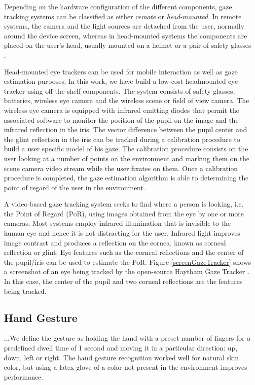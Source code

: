 \documentclass[jou,a4paper,notxfonts]{apa}
\begin{document}
Depending on the hardware configuration of the different components, gaze tracking systems can be classified as either
\textit{remote} or \textit{head-mounted}. In remote systems, the camera and the light sources are detached from the
user, normally around the device screen, whereas in head-mounted systems the components are placed on the user's head, usually
mounted on a helmet or a pair of safety glasses \cite{lowcostitugazetracker}.

Head-mounted eye trackers can be used for mobile interaction as well as gaze estimation purposes.
In this work, we have build a low-cost headmounted eye tracker using off-the-shelf components.  The system consists of
safety glasses, batteries, wireless eye camera and the wireless scene or field of view camera. The wireless eye camera
is equipped with infrared emitting diodes that permit the associated software to monitor the position of the pupil on the
image and the infrared reflection in the iris. The vector difference between the pupil center and the glint reflection
in the iris can be tracked during a calibration procedure to build a user specific model of his gaze. The calibration
procedure consists on the user looking at a number of points on the environment and marking them on the scene camera
video stream while the user fixates on them.  Once a calibration procedure is completed, the gaze estimation algorithm
is able to determining the point of regard of the user in the environment.

A video-based gaze tracking system seeks to find where a person is looking, i.e. the Point of Regard (PoR), using images
obtained from the eye by one or more cameras. Most systems employ infrared illumination that is invisible to the human
eye and hence it is not distracting for the user. Infrared light improves image contrast and produces a reflection on
the cornea, known as corneal reflection or glint. Eye features such as the corneal reflections and the center of the
pupil/iris can be used to estimate the PoR. Figure \ref{screenGazeTracker} shows a screenshot of an eye being tracked by
the open-source Haytham Gaze Tracker \cite{mardanbegi2012eye}. In this case, the center of the pupil and two
corneal reflections are the features being tracked.

\subsection{Hand Gesture}

 ...We define the gesture as holding the hand with a preset number of fingers for a predefined dwell time of 1 second and moving it in a particular direction: up, down, left  or right. The hand gesture recognition worked well for natural skin color, but using a latex glove of a color not present in the environment improves performance.
\end{document}
